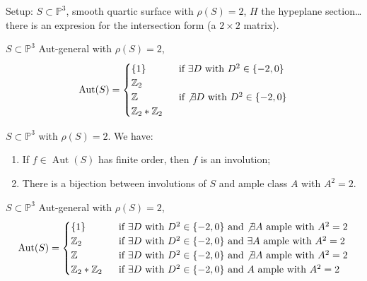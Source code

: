\begin{example}[Case \(\rho(S)=2\)]\leavevmode
Setup: \(S \subset \mathbb{P}^3\), smooth quartic surface with \(\rho(S)=2\), \(H\) the hypeplane section… there is an expresion for the intersection form (a \(2 \times 2\) matrix).
\end{example}

\begin{prop}\leavevmode
\(S \subset \mathbb{P}^3\) Aut-general with \(\rho(S)=2\),
\[\operatorname{Aut}(S)=\begin{cases}
	\{1\}\qquad & \text{ if \(\exists D\) with \(D^2 \in \{-2,0\}\)} \\
	\mathbb{Z}_2\qquad &\\
	\mathbb{Z} & \text{ if \(\not \exists D\) with \(D^2 \in \{-2,0\}\)} \\
	\mathbb{Z}_2 * \mathbb{Z}_2
\end{cases}\]
\end{prop}

\begin{prop}\leavevmode
\(S \subset \mathbb{P}^3\) with \(\rho(S)=2\). We have:
\begin{enumerate}
\item  If \(f \in \operatorname{Aut}(S)\) has finite order, then \(f\) is an involution;
\item There is a bijection between involutions of \(S\) and ample class \(A\) with \(A^2=2.\)
\end{enumerate}
\end{prop}

\begin{prop}\leavevmode
\(S \subset \mathbb{P}^3\) Aut-general with \(\rho(S)=2\),
\[\operatorname{Aut}(S)=\begin{cases}
	\{1\}\qquad & \text{ if \(\exists D\) with \(D^2 \in \{-2,0\}\) and \(\not\exists  A\) ample with \(A^2=2\)} \\
	\mathbb{Z}_2\qquad &\text{ if \(\exists D\) with \(D^2 \in \{-2,0\}\) and \(\exists  A\) ample with \(A^2=2\)}\\
	\mathbb{Z} & \text{ if \(\exists D\) with \(D^2 \in \{-2,0\}\) and \(\not\exists  A\) ample with \(A^2=2\)}\\
	\mathbb{Z}_2 * \mathbb{Z}_2 & \text{ if \(\exists D\) with \(D^2 \in \{-2,0\}\) and \( A\) ample with \(A^2=2\)}
\end{cases}\]
\end{prop}

